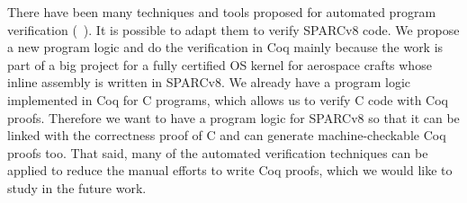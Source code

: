 There have been many techniques and tools proposed for automated
program verification (\eg~\cite{SymbolicExecutionSpLogic,Smallfoot}).
It is possible to adapt them to verify SPARCv8 code.
We propose a new program logic and do the verification in Coq mainly
because the work is part of a big project for a fully certified OS 
kernel for aerospace crafts whose inline assembly is written in 
SPARCv8. We already have a program logic implemented in Coq for 
C programs, which allows us to verify C code with Coq proofs. 
Therefore we want to have a program logic for SPARCv8 so that 
it can be linked with the correctness proof of 
C and can generate machine-checkable Coq proofs too.
That said, many of the automated verification techniques can
be applied to reduce the manual efforts to write Coq proofs,
which we would like to study in the future work. 


